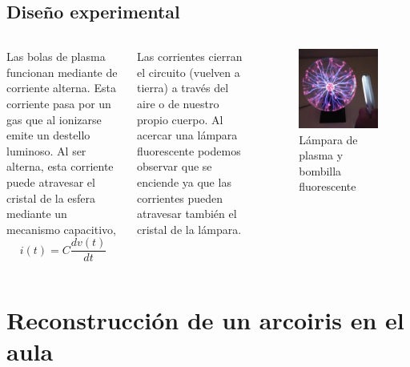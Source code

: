 \documentclass[]{presentation}
\begin{document}
\subsection{Diseño experimental}
\begin{frame}
\begin{columns}
	\justifying
	Las bolas de plasma funcionan mediante de corriente alterna. Esta corriente pasa por un gas que al ionizarse emite un destello luminoso. Al ser alterna, esta corriente puede atravesar el cristal de la esfera mediante un mecanismo capacitivo,
	$$
		i(t) = C \frac{d v(t)}{d t}
	$$
	
	Las corrientes cierran el circuito (vuelven a tierra) a través del aire o de nuestro propio cuerpo. Al acercar una lámpara fluorescente podemos observar que se enciende ya que las corrientes pueden atravesar también el cristal de la lámpara.
	\begin{figure}
		\centering
		\includegraphics[width=1\linewidth]{fig/experimentos/bola_de_plasma_y_bombilla}
		\caption{\centering Lámpara de plasma y bombilla fluorescente}
	\end{figure}
\end{columns}
\end{frame}

\section{Reconstrucción de un arcoiris en el aula}
\end{document}
